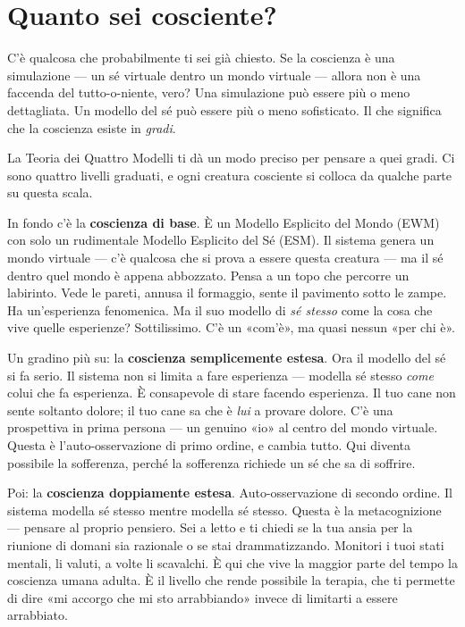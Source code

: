 \documentclass[11pt, twoside, openright]{book}
\begin{document}
\section*{Quanto sei cosciente?}

C'è qualcosa che probabilmente ti sei già chiesto. Se la coscienza è una simulazione --- un sé virtuale dentro un mondo virtuale --- allora non è una faccenda del tutto-o-niente, vero? Una simulazione può essere più o meno dettagliata. Un modello del sé può essere più o meno sofisticato. Il che significa che la coscienza esiste in \textit{gradi}.

La Teoria dei Quattro Modelli ti dà un modo preciso per pensare a quei gradi. Ci sono quattro livelli graduati, e ogni creatura cosciente si colloca da qualche parte su questa scala.

In fondo c'è la \textbf{coscienza di base}. È un Modello Esplicito del Mondo (EWM) con solo un rudimentale Modello Esplicito del Sé (ESM). Il sistema genera un mondo virtuale --- c'è qualcosa che si prova a essere questa creatura --- ma il sé dentro quel mondo è appena abbozzato. Pensa a un topo che percorre un labirinto. Vede le pareti, annusa il formaggio, sente il pavimento sotto le zampe. Ha un'esperienza fenomenica. Ma il suo modello di \textit{sé stesso} come la cosa che vive quelle esperienze? Sottilissimo. C'è un «com'è», ma quasi nessun «per chi è».

Un gradino più su: la \textbf{coscienza semplicemente estesa}. Ora il modello del sé si fa serio. Il sistema non si limita a fare esperienza --- modella sé stesso \textit{come} colui che fa esperienza. È consapevole di stare facendo esperienza. Il tuo cane non sente soltanto dolore; il tuo cane sa che è \textit{lui} a provare dolore. C'è una prospettiva in prima persona --- un genuino «io» al centro del mondo virtuale. Questa è l'auto-osservazione di primo ordine, e cambia tutto. Qui diventa possibile la sofferenza, perché la sofferenza richiede un sé che sa di soffrire.

Poi: la \textbf{coscienza doppiamente estesa}. Auto-osservazione di secondo ordine. Il sistema modella sé stesso mentre modella sé stesso. Questa è la metacognizione --- pensare al proprio pensiero. Sei a letto e ti chiedi se la tua ansia per la riunione di domani sia razionale o se stai drammatizzando. Monitori i tuoi stati mentali, li valuti, a volte li scavalchi. È qui che vive la maggior parte del tempo la coscienza umana adulta. È il livello che rende possibile la terapia, che ti permette di dire «mi accorgo che mi sto arrabbiando» invece di limitarti a essere arrabbiato.
\end{document}
